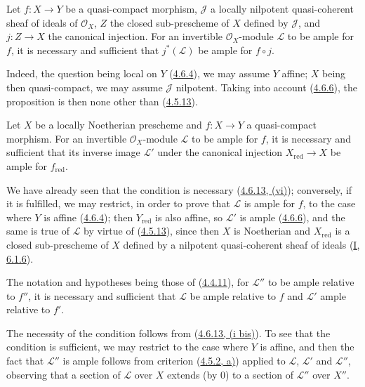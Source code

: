 \begin{proposition}[4.6.15]
\label{II.4.6.15}
Let $f:X\to Y$ be a quasi-compact morphism, $\mathcal{J}$ a locally
nilpotent quasi-coherent sheaf of ideals of $\mathcal{O}_X$, $Z$ the
closed sub-prescheme of $X$ defined by $\mathcal{J}$, and $j:Z\to X$
the canonical injection. For an invertible $\mathcal{O}_X$-module
$\mathcal{L}$ to be ample for $f$, it is necessary and sufficient that
$j^*(\mathcal{L})$ be ample for $f\circ j$.
\end{proposition}

Indeed, the question being local on $Y$
(\hyperref[II.4.6.4]{4.6.4}), we may assume $Y$ affine; $X$ being
then quasi-compact, we may assume $\mathcal{J}$ nilpotent. Taking into account
(\hyperref[II.4.6.6]{4.6.6}), the proposition is then none other than
(\hyperref[II.4.5.13]{4.5.13}).

\begin{corollary}[4.6.16]
\label{II.4.6.16}
Let $X$ be a locally Noetherian prescheme and $f:X\to Y$ a quasi-compact
morphism. For an invertible $\mathcal{O}_X$-module $\mathcal{L}$
to be ample for $f$, it is necessary and sufficient that its inverse image
$\mathcal{L}'$ under the canonical injection $X_{\mathrm{red}}\to X$ be ample
for $f_{\mathrm{red}}$.
\end{corollary}

We have already seen that the condition is necessary
(\hyperref[II.4.6.13]{4.6.13, (vi)}); conversely, if it is fulfilled,
we may restrict, in order to prove that $\mathcal{L}$ is ample for $f$, to the
case where $Y$ is affine (\hyperref[II.4.6.4]{4.6.4}); then
$Y_{\mathrm{red}}$ is also affine, so $\mathcal{L}'$ is ample
(\hyperref[II.4.6.6]{4.6.6}), and the same is true of $\mathcal{L}$ by
virtue of (\hyperref[II.4.5.13]{4.5.13}), since then $X$ is
Noetherian and $X_{\mathrm{red}}$ is a closed sub-prescheme of $X$ defined by
a nilpotent quasi-coherent sheaf of ideals
(\hyperref[I.6.1.6]{I, 6.1.6}).

\begin{proposition}[4.6.17]
\label{II.4.6.17}
The notation and hypotheses being those of
(\hyperref[II.4.4.11]{4.4.11}), for $\mathcal{L}''$ to be ample
relative to $f''$, it is necessary and sufficient that $\mathcal{L}$ be ample
relative to $f$ and $\mathcal{L}'$ ample relative to $f'$.
\end{proposition}


The necessity of the condition follows from
(\hyperref[II.4.6.13]{4.6.13, (i bis)}). To see that the condition is
sufficient, we may restrict to the case where $Y$ is affine, and then the fact
that $\mathcal{L}''$ is ample follows from criterion
(\hyperref[II.4.5.2]{4.5.2, a)}) applied to $\mathcal{L}$,
$\mathcal{L}'$ and $\mathcal{L}''$, observing that a section of
$\mathcal{L}$ over $X$ extends (by $0$) to a section of
$\mathcal{L}''$ over $X''$.

